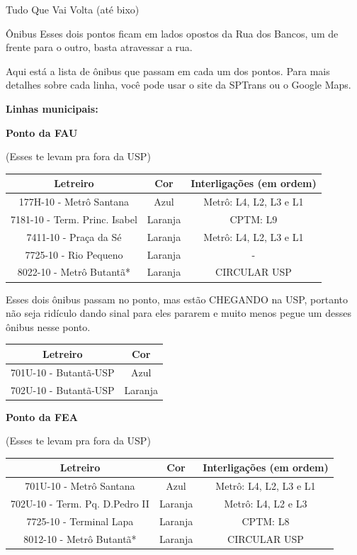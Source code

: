 \begin{secao}{Tudo Que Vai Volta (até bixo)}
\begin{subsecao}{Ônibus}
Esses dois pontos ficam em lados opostos da Rua dos Bancos, um de frente para o
outro, basta atravessar a rua. 

Aqui está a lista de ônibus que passam em cada um dos pontos. Para mais detalhes
sobre cada linha, você pode usar o site da SPTrans ou o Google Maps.

{\bf Linhas municipais:}

{\bf Ponto da FAU}

(Esses te levam pra fora da USP)
\begin{center}
	\begin{tabular}{|c|c|c|}
      \hline
	  Letreiro & Cor & Interligações (em ordem)\\
	  \hline
	  177H-10 - Metrô Santana & Azul & Metrô: L4, L2, L3 e L1\\
	  7181-10 - Term. Princ. Isabel & Laranja & CPTM: L9\\
	  7411-10 - Praça da Sé & Laranja & Metrô: L4, L2, L3 e L1\\
	  7725-10 - Rio Pequeno & Laranja & - \\
	  8022-10 - Metrô Butantã* & Laranja & CIRCULAR USP\\
      \hline
	\end{tabular}
\end{center}

Esses dois ônibus passam no ponto, mas estão CHEGANDO na USP, portanto não seja
ridículo dando sinal para eles pararem e muito menos pegue um desses ônibus
nesse ponto.

\begin{center}
	\begin{tabular}{|c|c|}
	  \hline
	  Letreiro & Cor\\
	  \hline
	  701U-10 - Butantã-USP & Azul\\
	  702U-10 - Butantã-USP & Laranja\\
	  \hline
	\end{tabular}
\end{center}

{\bf Ponto da FEA}

(Esses te levam pra fora da USP)
\begin{center}
	\begin{tabular}{|c|c|c|}
      \hline
	  Letreiro & Cor & Interligações (em ordem)\\
	  \hline
	  701U-10 - Metrô Santana & Azul & Metrô: L4, L2, L3 e L1\\
	  702U-10 - Term. Pq. D.Pedro II & Laranja & Metrô: L4, L2 e L3\\
	  7725-10 - Terminal Lapa & Laranja & CPTM: L8\\
	  8012-10 - Metrô Butantã* & Laranja & CIRCULAR USP\\
      \hline
	\end{tabular}
\end{center}


\end{subsecao}
\end{secao}
